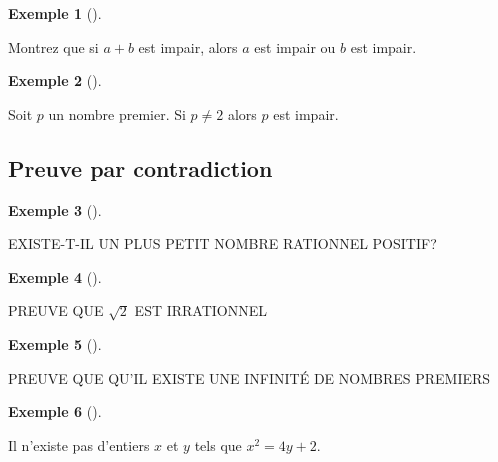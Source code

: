 \documentclass[
  letterpaper,
]{scrbook}
\theoremstyle{definition}
\newtheorem{example}{Exemple}[chapter]
\theoremstyle{definition}
\theoremstyle{plain}
\theoremstyle{remark}
\begin{document}
\leavevmode{}%
\begin{example}[]\label{exm-aplusb-impair-a-b-impair}

Montrez que si \(a+b\) est impair, alors \(a\) est impair ou \(b\) est
impair.

\end{example}

\leavevmode{}%
\begin{example}[]\label{exm-nombre-premier-impair}

Soit \(p\) un nombre premier. Si \(p\neq 2\) alors \(p\) est impair.

\end{example}

\hypertarget{preuve-par-contradiction}{%
\subsection{Preuve par contradiction}\label{preuve-par-contradiction}}

\leavevmode{}%
\begin{example}[]\label{exm-plus-petit-nombre-rationnel}

EXISTE-T-IL UN PLUS PETIT NOMBRE RATIONNEL POSITIF?

\end{example}

\leavevmode{}%
\begin{example}[]\label{exm-sqrt2-irrationnel}

PREUVE QUE \(\sqrt{2}\) EST IRRATIONNEL

\end{example}

\leavevmode{}%
\begin{example}[]\label{exm-infinite-nombres-premiers}

PREUVE QUE QU'IL EXISTE UNE INFINITÉ DE NOMBRES PREMIERS

\end{example}

\leavevmode{}%
\begin{example}[]\label{exm-pas-entiers-equation}

Il n'existe pas d'entiers \(x\) et \(y\) tels que \(x^2=4y+2\).

\end{example}
\end{document}
